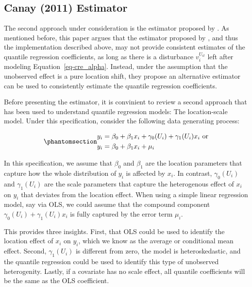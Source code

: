 \documentclass[bib]{statapress}
\begin{document}
\subsection{Canay (2011) Estimator}\label{sec-canay}

The second approach under consideration is the estimator proposed by
\citet{canay2011}. As mentioned before, this paper argues that the
estimator proposed by \citet{abrevaya2008}, and thus the implementation
described above, may not provide consistent estimates of the quantile
regression coefficients, as long as there is a disturbance
\(v^{U_{it}}_i\) left after modeling Equation~\ref{eq-cre_alpha}.
Instead, under the assumption that the unobserved effect is a pure
location shift, they propose an alternative estimator can be used to
consistently estimate the quantile regression coefficients.

Before presenting the estimator, it is convinient to review a second
approach that has been used to understand quantile regression models:
The location-scale model. Under this specification, consider the
following data generating process:

\begin{equation}\phantomsection\label{eq-loc-scale}{\begin{aligned}
y_i &= \beta_0+\beta_1 x_i + \gamma_0(U_i) + \gamma_1(U_i) x_{i} \ \text{or}\\
y_i &= \beta_0+\beta_1 x_i + \mu_i
\end{aligned}
}\end{equation}

In this specification, we assume that \(\beta_0\) and \(\beta_1\) are
the location parameters that capture how the whole distribution of
\(y_i\) is affected by \(x_i\). In contrast, \(\gamma_0(U_i)\) and
\(\gamma_1(U_i)\) are the scale parameters that capture the heterogenous
effect of \(x_i\) on \(y_i\) that deviates from the location effect.
When using a simple linear regression model, say via OLS, we could
assume that the compound component
\(\gamma_0(U_i) + \gamma_1(U_i) x_{i}\) is fully captured by the error
term \(\mu_i\).

This provides three insights. First, that OLS could be used to identify
the location effect of \(x_i\) on \(y_i\), which we know as the average
or conditional mean effect. Second, \(\gamma_1(U_i)\) is different from
zero, the model is heteroskedastic, and the quantile regression could be
used to identify this type of unobserved heterogenity. Lastly, if a
covariate has no scale effect, all quantile coefficients will be the
same as the OLS coefficient.
\end{document}

